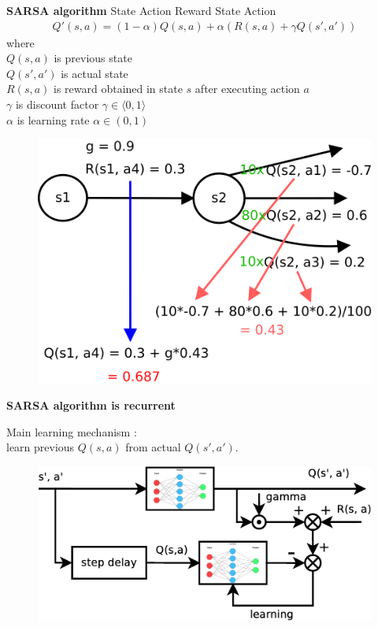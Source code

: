 \documentclass[xcolor=dvipsnames]{beamer}
\begin{document}
\begin{frame}{\bf SARSA algorithm}
State Action Reward State Action \footnotemark
\begin{align*}
Q'(s, a) = (1-\alpha)Q(s, a) + \alpha(R(s, a) + \gamma Q(s', a'))
\end{align*}
where \\
$Q(s, a)$ is previous state \\
$Q(s', a')$ is actual state \\
$R(s, a)$ is reward obtained in state $s$ after executing action $a$ \\
$\gamma$ is discount factor $\gamma \in \langle0, 1\rangle$ \\
$\alpha$ is learning rate $\alpha \in (0, 1)$
\begin{figure}[htbp]
  \centering
  \includegraphics[scale=0.13]{../diagrams/sarsa_learning_detail.png}
\end{figure}



\end{frame}

\begin{frame}{\bf SARSA algorithm is recurrent}

Main learning mechanism : \\
learn previous $Q(s, a)$ from actual $Q(s', a')$. \\

\begin{figure}[htbp]
  \centering
  \includegraphics[scale=0.4]{../diagrams/rl_recurrent.png}
\end{figure}

\end{frame}
\end{document}
